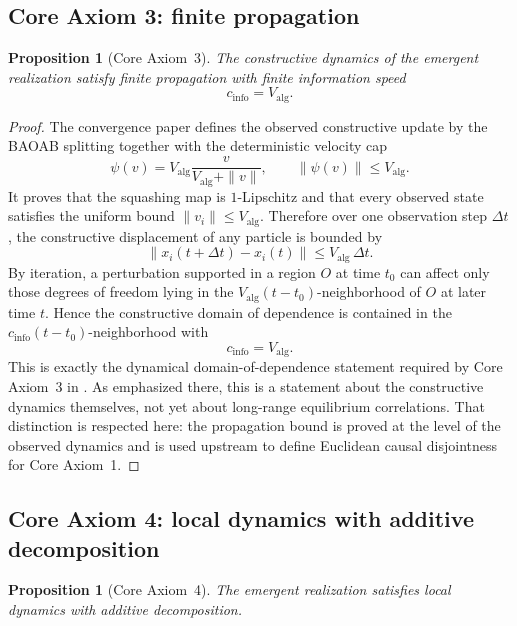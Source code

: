 \documentclass[11pt]{article}
\newtheorem{proposition}[theorem]{Proposition}
\theoremstyle{definition}
\theoremstyle{remark}
\begin{document}
\subsection{Core Axiom 3: finite propagation}

\begin{proposition}[Core Axiom~3]
\label{prop:ca3}
The constructive dynamics of the emergent realization satisfy finite propagation
with finite information speed
\[
c_{\mathrm{info}}=V_{\mathrm{alg}}.
\]
\end{proposition}

\begin{proof}
The convergence paper defines the observed constructive update by the BAOAB
splitting together with the deterministic velocity cap
\[
\psi(v)=V_{\mathrm{alg}}\frac{v}{V_{\mathrm{alg}}+\|v\|},
\qquad
\|\psi(v)\|\le V_{\mathrm{alg}}.
\]
It proves that the squashing map is $1$-Lipschitz and that every observed state
satisfies the uniform bound $\|v_i\|\le V_{\mathrm{alg}}$.
Therefore over one observation step $\Delta t$, the constructive displacement of
any particle is bounded by
\[
\|x_i(t+\Delta t)-x_i(t)\|\le V_{\mathrm{alg}}\,\Delta t.
\]
By iteration, a perturbation supported in a region $O$ at time $t_0$ can affect
only those degrees of freedom lying in the
$V_{\mathrm{alg}}(t-t_0)$-neighborhood of $O$ at later time $t$.  Hence the
constructive domain of dependence is contained in the
$c_{\mathrm{info}}(t-t_0)$-neighborhood with
\[
c_{\mathrm{info}}=V_{\mathrm{alg}}.
\]
This is exactly the dynamical domain-of-dependence statement required by Core
Axiom~3 in \cite{axioms}.  As emphasized there, this is a statement about the
constructive dynamics themselves, not yet about long-range equilibrium
correlations.  That distinction is respected here: the propagation bound is
proved at the level of the observed dynamics and is used upstream to define
Euclidean causal disjointness for Core Axiom~1.
\end{proof}

\subsection{Core Axiom 4: local dynamics with additive decomposition}

\begin{proposition}[Core Axiom~4]
\label{prop:ca4}
The emergent realization satisfies local dynamics with additive decomposition.
\end{proposition}
\end{document}
